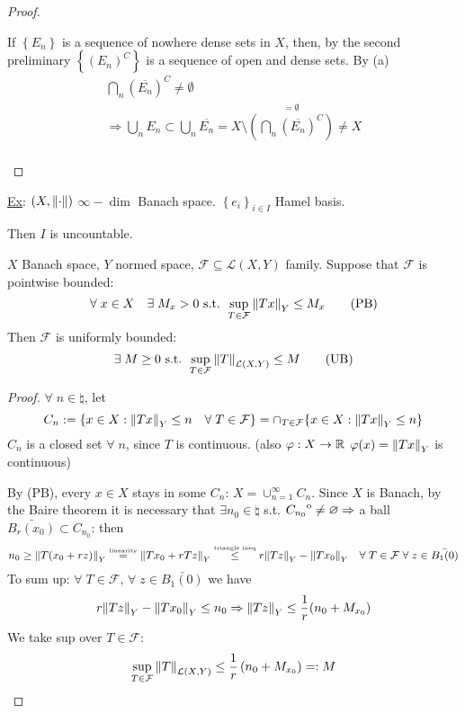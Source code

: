 \begin{proof}
\begin{itemize}
        If \(\left\{ E_n \right\}\) is a sequence of nowhere dense sets in \(X\), then, by the second preliminary \(\left\{ (E_n)^C \right\}\) is a sequence of open and dense sets. By (a) 
        \[
            \begin{array}{l}
                \bigcap_n (\overline{E_n})^C \neq \emptyset \\
                \Rightarrow \bigcup_n E_n \subset \bigcup_n \overline{E_n} = X \setminus \overset{= \emptyset}{\left(\bigcap_n (\overline{E_n})^C\right)} \neq X \\

            \end{array} 
        \]
    \end{itemize}
\end{proof}
\noindent\underline{Ex}: \((X, \norm{\cdot})\) \(\infty-\dim\) Banach space. \(\left\{ e_i \right\}_{i \in I}\) Hamel basis. 

Then \(I\) is uncountable.
\begin{theorem}
    \(X\) Banach space, \(Y\) normed space, \(\mathcal{F} \subseteq \mathcal{L}(X, Y)\) family.
    Suppose that \(\mathcal{F}\) is pointwise bounded: 
    \[
        \forall\; x \in X \quad \exists \; M_x >0 \text{ s.t. } \sup_{T \in \mathcal{F}} \norm{Tx}_Y \leq M_x \tag*{(PB)}
    \]
    Then \(\mathcal{F} \) is uniformly bounded: 
    \[
        \exists \; M \geq 0 \text{ s.t. } \sup_{T \in \mathcal{F}} \norm{T}_{\mathcal{L}(X, Y)} \leq M \tag*{(UB)}
    \]
\end{theorem}
\begin{proof}
    \(\forall \; n \in \natural\), let 
    \[
        C_n := \{ x \in X: \norm{Tx}_Y \leq n \quad \forall \; T \in \mathcal{F} \} 
        = \cap_{T \in \mathcal{F}} \{ x \in X: \norm{Tx}_Y \leq n \}
    \]
    \(C_n\) is a closed set \(\forall \; n\), since \(T\) is continuous. (also \(\varphi: X \to \mathbb{R} \) \(\varphi(x)=\norm{Tx}_Y\) is continuous)

    By (PB), every \(x \in X\) stays in some \(C_n\): \(X = \cup_{n=1}^\infty C_n\). 
    Since \(X\) is Banach, by the Baire theorem it is necessary that \(\exists n_0 \in \natural\) s.t. \({\kern0ptC_{n_0}}^{\mathrm{o}} \neq \varnothing \Rightarrow\) a ball \(\bar{B_r(x_0)} \subset C_{n_0}\): then
    \[
        n_0 \geq \norm{T(x_0 + rz)}_Y \overset{\text{\tiny{linearity}}}{=} \norm{Tx_0 + rTz}_Y \overset{\text{\tiny{triangle ineq}}}{\leq} r\norm{Tz}_Y - \norm{Tx_0}_Y \quad \forall \; T \in \mathcal{F} \; \forall \; z \in \bar{B_1(0)}
    \]
    To sum up: \(\forall \; T \in \mathcal{F} \), \(\forall \; z \in \bar{B_1(0)}\) we have 
    \[
        r \norm{Tz}_Y - \norm{Tx_0}_Y \leq n_0 \Rightarrow \norm{Tz}_Y \leq \frac{1}{r}(n_0 + M_{x_0})
    \]
    We take sup over \(T \in \mathcal{F}\):
    \[
        \sup_{T \in \mathcal{F}} \norm{T}_{\mathcal{L}(X, Y)} \leq \frac{1}{r} \left(n_0 + M_{x_0}\right) =: M
    \]
\end{proof}


